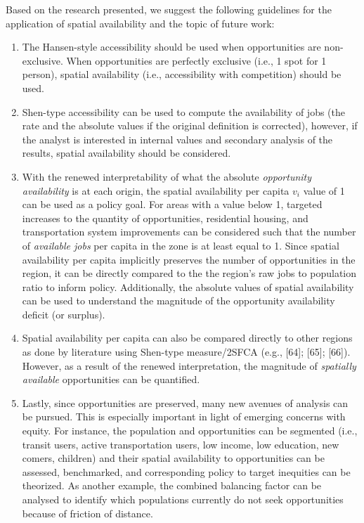 \documentclass[10pt,letterpaper]{article}
\begin{document}
Based on the research presented, we suggest the following guidelines for
the application of spatial availability and the topic of future work:

\begin{enumerate}
\def\labelenumi{\arabic{enumi})}
\item
  The Hansen-style accessibility should be used when opportunities are
  non-exclusive. When opportunities are perfectly exclusive (i.e., 1
  spot for 1 person), spatial availability (i.e., accessibility with
  competition) should be used.
\item
  Shen-type accessibility can be used to compute the availability of
  jobs (the rate and the absolute values if the original definition is
  corrected), however, if the analyst is interested in internal values
  and secondary analysis of the results, spatial availability should be
  considered.
\item
  With the renewed interpretability of what the absolute
  \emph{opportunity availability} is at each origin, the spatial
  availability per capita \(v_i\) value of 1 can be used as a policy
  goal. For areas with a value below 1, targeted increases to the
  quantity of opportunities, residential housing, and transportation
  system improvements can be considered such that the number of
  \emph{available jobs} per capita in the zone is at least equal to 1.
  Since spatial availability per capita implicitly preserves the number
  of opportunities in the region, it can be directly compared to the the
  region's raw jobs to population ratio to inform policy. Additionally,
  the absolute values of spatial availability can be used to understand
  the magnitude of the opportunity availability deficit (or surplus).
\item
  Spatial availability per capita can also be compared directly to other
  regions as done by literature using Shen-type measure/2SFCA (e.g.,
  {[}64{]}; {[}65{]}; {[}66{]}). However, as a result of the renewed
  interpretation, the magnitude of \emph{spatially available}
  opportunities can be quantified.
\item
  Lastly, since opportunities are preserved, many new avenues of
  analysis can be pursued. This is especially important in light of
  emerging concerns with equity. For instance, the population and
  opportunities can be segmented (i.e., transit users, active
  transportation users, low income, low education, new comers, children)
  and their spatial availability to opportunities can be assessed,
  benchmarked, and corresponding policy to target inequities can be
  theorized. As another example, the combined balancing factor can be
  analysed to identify which populations currently do not seek
  opportunities because of friction of distance.
\end{enumerate}
\end{document}
